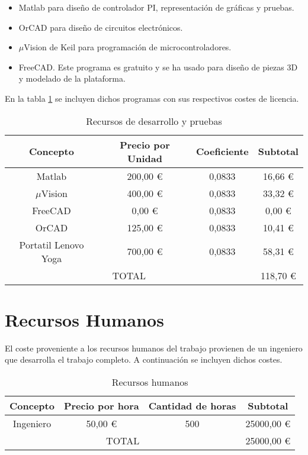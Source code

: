 \begin{itemize}
    \item Matlab para diseño de controlador PI, representación de gráficas y pruebas.
    \item OrCAD para diseño de circuitos electrónicos.
    \item $\mu$Vision de Keil para programación de microcontroladores.
    \item FreeCAD. Este programa es gratuito y se ha usado para diseño de piezas 3D y modelado de la plataforma.
\end{itemize}

En la tabla \ref{tab:recursos_software} se incluyen dichos programas con sus respectivos costes de licencia.

\begin{table}[H]
\centering
\begin{tabular}{|c|c|c|c|}
\hline
Concepto    & Precio por Unidad & Coeficiente & Subtotal \\ \hline
Matlab      & 200,00 \euro                 & 0,0833        & 16,66 \euro        \\ \hline
$\mu$Vision & 400,00 \euro                 & 0,0833        & 33,32 \euro        \\ \hline
FreeCAD       & 0,00 \euro                 & 0,0833        & 0,00 \euro       \\ \hline
OrCAD     & 125,00 \euro                 & 0,0833        & 10,41 \euro        \\ \hline
Portatil Lenovo Yoga     & 700,00 \euro                 & 0,0833        & 58,31 \euro        \\ \hline
\multicolumn{3}{|c|}{TOTAL}                & 118,70 \euro        \\ \hline
\end{tabular}
\caption{Recursos de desarrollo y pruebas}
\label{tab:recursos_software}
\end{table}

\section{Recursos Humanos}
\label{sec:presupuesto-mano}

El coste proveniente a los recursos humanos del trabajo provienen de un ingeniero que desarrolla el trabajo completo. A continuación se incluyen dichos costes.

\begin{table}[H]
\centering
\begin{tabular}{|c|c|c|c|}
\hline
Concepto  & Precio por hora & Cantidad de horas & Subtotal \\ \hline
Ingeniero & 50,00 \euro              & 500                 & 25000,00 \euro       \\ \hline
\multicolumn{3}{|c|}{TOTAL}                     & 25000,00 \euro        \\ \hline
\end{tabular}
\caption{Recursos humanos}
\label{tab:recursos_humanos}
\end{table}

